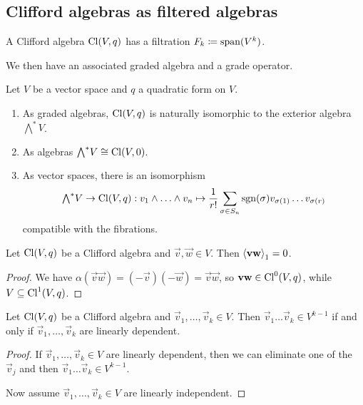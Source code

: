 \subsection{Clifford algebras as filtered algebras}
\begin{proposition}
A Clifford algebra $\operatorname{Cl}(V,q)$ has a filtration $F_k \coloneqq \operatorname{span}(V^{k})$.
\end{proposition}

We then have an associated graded algebra and a grade operator.

\begin{proposition}
Let $V$ be a vector space and $q$ a quadratic form on $V$.
\begin{enumerate}
\item As graded algebras, $\operatorname{Cl}(V,q)$ is naturally isomorphic to the exterior algebra ${\textstyle\bigwedge}^* V$.
\item As algebras ${\textstyle\bigwedge}^* V \cong \operatorname{Cl}(V,0)$.
\item As vector spaces, there is an isomorphism
\[ {\textstyle\bigwedge}^* V \to \operatorname{Cl}(V,q): v_1\wedge \ldots \wedge v_n \mapsto \frac{1}{r!}\sum_{\sigma\in S_n}\operatorname{sgn}(\sigma)v_{\sigma(1)}\hdots v_{\sigma(r)} \]
compatible with the fibrations.
\end{enumerate}
\end{proposition}

\begin{lemma}
Let $\operatorname{Cl}(V,q)$ be a Clifford algebra and $\vec{v},\vec{w}\in V$. Then $\left\langle \boldsymbol{\mathrm{v}}\boldsymbol{\mathrm{w}} \right\rangle_1 = 0$.
\end{lemma}
\begin{proof}
We have $\alpha(\vec{v}\vec{w}) = (-\vec{v})(-\vec{w}) = \vec{v}\vec{w}$, so $\boldsymbol{\mathrm{v}}\boldsymbol{\mathrm{w}}\in\operatorname{Cl}^0(V,q)$, while $V\subseteq \operatorname{Cl}^1(V,q)$.
\end{proof}

\begin{proposition}
Let $\operatorname{Cl}(V,q)$ be a Clifford algebra and $\vec{v}_1, \ldots, \vec{v}_k\in V$. Then $\vec{v}_1\ldots\vec{v}_k \in V^{k-1}$ \textup{if and only if} $\vec{v}_1,\ldots,\vec{v}_k$ are linearly dependent.
\end{proposition}
\begin{proof}
If $\vec{v}_1, \ldots, \vec{v}_k\in V$ are linearly dependent, then we can eliminate one of the $\vec{v}_j$ and then $\vec{v}_1\ldots\vec{v}_k \in V^{k-1}$.

Now assume $\vec{v}_1, \ldots, \vec{v}_k\in V$ are linearly independent.
\end{proof}

